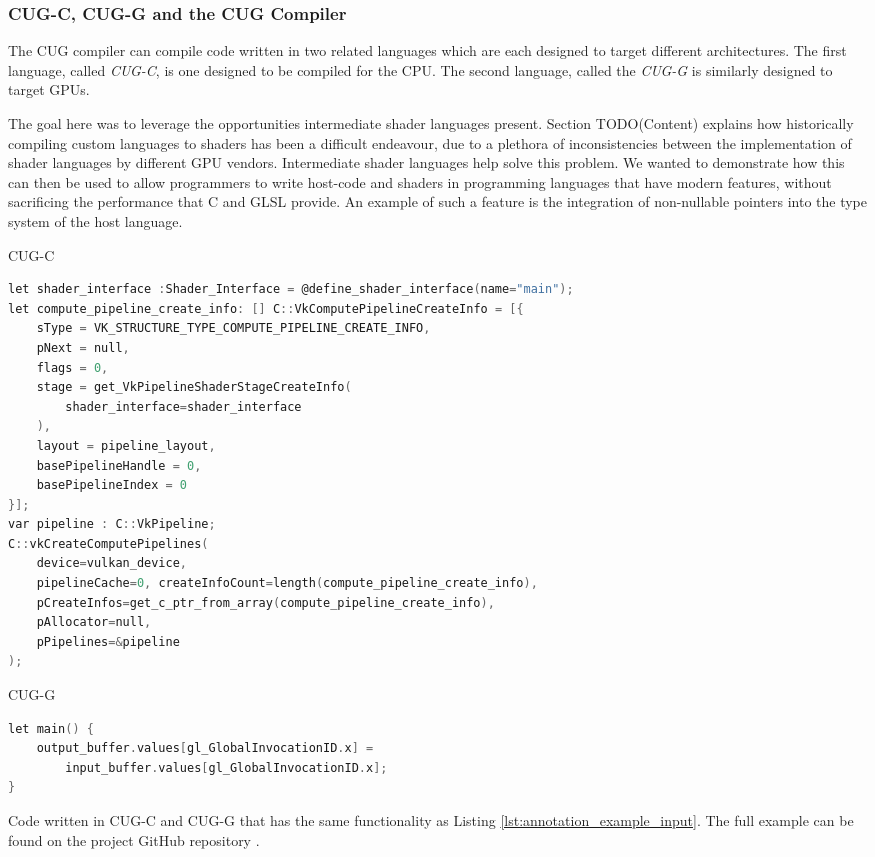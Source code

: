 \documentclass[a4paper,12pt,twoside,openright]{report}
\begin{document}
\subsubsection{CUG-C, CUG-G and the CUG Compiler}

The CUG compiler can compile code written in two related languages which are each
designed to target different architectures. The first language, called
\textit{CUG-C}, is one designed to be compiled for the CPU. The second
language, called the \textit{CUG-G} is similarly designed to target GPUs.


The goal here was to leverage the opportunities intermediate shader languages
present. Section TODO(Content) explains how historically compiling custom
languages to shaders has been a difficult endeavour, due to a plethora of
inconsistencies between the implementation of shader languages by different GPU
vendors. Intermediate shader languages help solve this problem. We wanted to
demonstrate how this can then be used to allow programmers to write host-code
and shaders in programming languages that have modern features, without
sacrificing the performance that C and GLSL provide. An example of such a
feature is the integration of non-nullable pointers into the type system of the
host language.



\begin{lstfloat}
\begin{center} CUG-C \end{center}
\begin{lstlisting}[language=C]
let shader_interface :Shader_Interface = @define_shader_interface(name="main");
let compute_pipeline_create_info: [] C::VkComputePipelineCreateInfo = [{
    sType = VK_STRUCTURE_TYPE_COMPUTE_PIPELINE_CREATE_INFO,
    pNext = null,
    flags = 0,
    stage = get_VkPipelineShaderStageCreateInfo(
        shader_interface=shader_interface
    ),
    layout = pipeline_layout,
    basePipelineHandle = 0,
    basePipelineIndex = 0
}];
var pipeline : C::VkPipeline;
C::vkCreateComputePipelines(
    device=vulkan_device,
    pipelineCache=0, createInfoCount=length(compute_pipeline_create_info),
    pCreateInfos=get_c_ptr_from_array(compute_pipeline_create_info),
    pAllocator=null,
    pPipelines=&pipeline
);
\end{lstlisting}
\begin{center} CUG-G \end{center}
\begin{lstlisting}[language=C]
let main() {
    output_buffer.values[gl_GlobalInvocationID.x] =
        input_buffer.values[gl_GlobalInvocationID.x];
}
\end{lstlisting}
\caption{Code written in CUG-C and CUG-G that has the same functionality as
Listing \ref{lst:annotation_example_input}. The full example can be found on
the project GitHub repository \cite{ProjectSource}.}
\label{lst:language_example}
\end{lstfloat}
\end{document}
